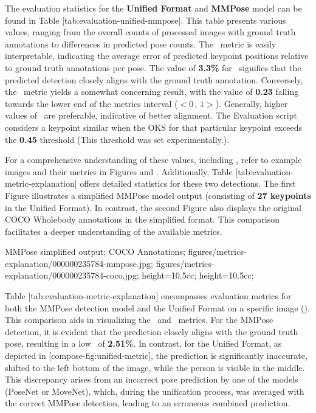 The evaluation statistics for the {\bf Unified Format} and {\bf MMPose} model can be found in Table [tab:evaluation-unified-mmpose]. This table presents various values, ranging from the overall counts of processed images with ground truth annotations to differences in predicted pose counts. The \APE\ metric is easily interpretable, indicating the average error of predicted keypoint positions relative to ground truth annotations per pose. The value of {\bf 3.3\%} for \APE\ signifies that the predicted detection closely aligns with the ground truth annotation. Conversely, the \OKS\ metric yields a somewhat concerning result, with the value of {\bf 0.23} falling towards the lower end of the metrics interval ($ <0\,,\,1> $). Generally, higher values of \OKS\ are preferable, indicative of better alignment. The Evaluation script considers a keypoint similar when the OKS for that particular keypoint exceeds the {\bf 0.45} threshold (This threshold was set experimentally.).

For a comprehensive understanding of these values, including \MSE, refer to example images and their metrics in Figures  and . Additionally, Table [tab:evaluation-metric-explanation] offers detailed statistics for these two detections. The first Figure illustrates a simplified MMPose model output (consisting of {\bf 27 keypoints} in the Unified Format). In contrast, the second Figure also displays the original COCO Wholebody annotations in the simplified format. This comparison facilitates a deeper understanding of the available metrics.

 {
 MMPose simplified output;
 COCO Annotations;
 }
 {
 figures/metrics-explanation/000000235784-mmpose.jpg;
 figures/metrics-explanation/000000235784-coco.jpg;
 }
 {
 height=10.5cc;
 height=10.5cc;
 }


Table [tab:evaluation-metric-explanation] encompasses evaluation metrics for both the MMPose detection model and the Unified Format on a specific image (). This comparison aids in visualizing the \APE\ and \MSE\ metrics. For the MMPose detection, it is evident that the prediction closely aligns with the ground truth pose, resulting in a low \APE\ of {\bf 2.51\%}. In contrast, for the Unified Format, as depicted in [compose-fig:unified-metric], the prediction is significantly inaccurate, shifted to the left bottom of the image, while the person is visible in the middle. This discrepancy arises from an incorrect pose prediction by one of the models (PoseNet or MoveNet), which, during the unification process, was averaged with the correct MMPose detection, leading to an erroneous combined prediction.


